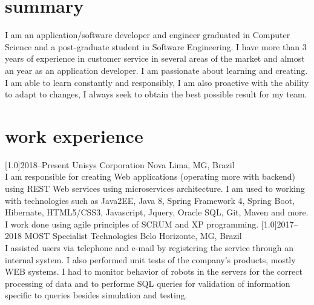 \documentclass[portuguese]{cv-style}     %
\begin{document}
\section{summary}
  \vspace{-0.2cm}
I am an application/software developer and engineer graduated in Computer Science and a post-graduate student in Software Engineering. I have more than 3 years of experience in customer service in several areas of the market and almost an year as an application developer. I am passionate about learning and creating. I am able to learn constantly and responsibly, I am also proactive with the ability to adapt to changes, I always seek to obtain the best possible result for my team.
\section{work experience}
  \vspace{-0.2cm}
\begin{entrylist}
\entry
  {\scalebox{.8}[1.0]{2018--Present}}
  {Unisys Corporation}
  {Nova Lima, MG, Brazil}
  {\\
  I am responsible for creating Web applications (operating more with backend) using REST Web services using microservices architecture. I am used to working with technologies such as Java2EE, Java 8, Spring Framework 4, Spring Boot, Hibernate, HTML5/CSS3, Javascript, Jquery, Oracle SQL, Git, Maven and more. I work done using agile principles of SCRUM and XP programming.}
\vspace{-0.3cm}
\entry
  {\scalebox{.8}[1.0]{2017--2018}}
  {MOST Specialist Technologies}
  {Belo Horizonte, MG, Brazil}
  {\\
  I assisted users via telephone and e-mail by registering the service through an internal system. I also performed unit tests of the company's products, mostly WEB systems. I had to monitor behavior of robots in the servers for the correct processing of data and to performe SQL queries for validation of information specific to queries besides simulation and testing.}
\end{entrylist}
\end{document}
